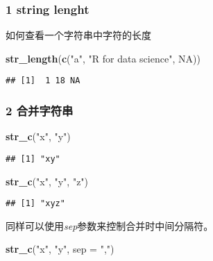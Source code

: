 \documentclass[]{article}
\newenvironment{Shaded}{\begin{snugshade}}{\end{snugshade}}
\newcommand{\DataTypeTok}[1]{\textcolor[rgb]{0.13,0.29,0.53}{#1}}
\newcommand{\KeywordTok}[1]{\textcolor[rgb]{0.13,0.29,0.53}{\textbf{#1}}}
\newcommand{\NormalTok}[1]{#1}
\newcommand{\OtherTok}[1]{\textcolor[rgb]{0.56,0.35,0.01}{#1}}
\newcommand{\StringTok}[1]{\textcolor[rgb]{0.31,0.60,0.02}{#1}}
\begin{document}
\hypertarget{string-lenght}{%
\subsubsection{1 string lenght}\label{string-lenght}}

如何查看一个字符串中字符的长度

\begin{Shaded}
\begin{Highlighting}[]
\KeywordTok{str_length}\NormalTok{(}\KeywordTok{c}\NormalTok{(}\StringTok{"a"}\NormalTok{, }\StringTok{"R for data science"}\NormalTok{, }\OtherTok{NA}\NormalTok{))}
\end{Highlighting}
\end{Shaded}

\begin{verbatim}
## [1]  1 18 NA
\end{verbatim}

\hypertarget{section}{%
\subsubsection{2 合并字符串}\label{section}}

\begin{Shaded}
\begin{Highlighting}[]
\KeywordTok{str_c}\NormalTok{(}\StringTok{"x"}\NormalTok{, }\StringTok{"y"}\NormalTok{)}
\end{Highlighting}
\end{Shaded}

\begin{verbatim}
## [1] "xy"
\end{verbatim}

\begin{Shaded}
\begin{Highlighting}[]
\KeywordTok{str_c}\NormalTok{(}\StringTok{"x"}\NormalTok{, }\StringTok{"y"}\NormalTok{, }\StringTok{"z"}\NormalTok{)}
\end{Highlighting}
\end{Shaded}

\begin{verbatim}
## [1] "xyz"
\end{verbatim}

同样可以使用\emph{sep}参数来控制合并时中间分隔符。

\begin{Shaded}
\begin{Highlighting}[]
\KeywordTok{str_c}\NormalTok{(}\StringTok{"x"}\NormalTok{, }\StringTok{"y"}\NormalTok{, }\DataTypeTok{sep =} \StringTok{","}\NormalTok{)}
\end{Highlighting}
\end{Shaded}
\end{document}
